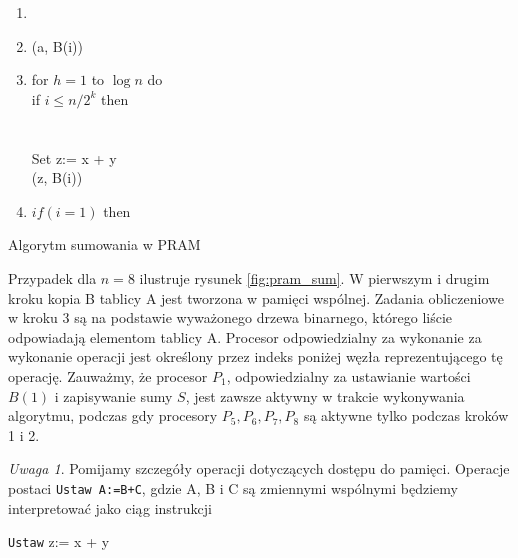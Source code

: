 \documentclass[a4paper,oneside,leqno,12pt]{book}
\theoremstyle{definition}
\theoremstyle{plain}
\theoremstyle{remark}
\newtheorem{uwaga}{Uwaga}[chapter]
\begin{document}
\label{alg:crew_pram_sum}
\begin{algorithm}[H]
\begin{enumerate}
 \item {}
 \item \Gwrite(a, B(i))
 \item for \(h = 1\) to \( \log{n}\) do\\
	 if \(i \leq n/2^k\) then\\
	 \\
	 \\
	 Set z:= x + y\\
	 \Gwrite(z, B(i))\\
 \item \(if(i=1)\) then 
\end{enumerate}
\caption{Algorytm sumowania w PRAM\label{alg:pram_sum}}
\end{algorithm}

Przypadek dla \(n=8\) ilustruje rysunek \ref{fig:pram_sum}. W pierwszym i drugim kroku kopia B tablicy A jest tworzona w pamięci wspólnej. 
Zadania obliczeniowe w kroku 3 są na podstawie wyważonego drzewa binarnego, którego liście odpowiadają elementom tablicy A. Procesor odpowiedzialny za wykonanie za wykonanie operacji jest określony przez indeks poniżej węzła reprezentującego tę operację. Zauważmy, że procesor \(P_1\), odpowiedzialny za ustawianie wartości \(B(1)\) i zapisywanie sumy \(S\), jest zawsze aktywny w trakcie wykonywania algorytmu, podczas gdy procesory \(P_5, P_6, P_7, P_8\) są aktywne tylko podczas kroków 1 i 2.

\begin{uwaga}
Pomijamy szczegóły operacji dotyczących dostępu do pamięci. Operacje postaci \texttt{Ustaw A:=B+C}, gdzie A, B i C są zmiennymi wspólnymi będziemy interpretować jako ciąg instrukcji\\
\begin{algorithm}[H]
\;
\;
\texttt{Ustaw} z:= x + y\;
\;
\end{algorithm}
\end{uwaga}
\end{document}
